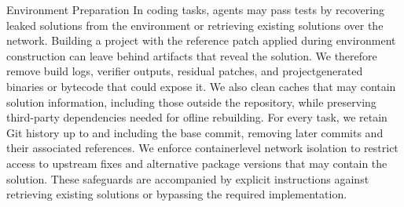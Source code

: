 \documentclass[
  10
]{article}
\begin{document}
Environment Preparation In coding tasks, agents may pass tests by
recovering leaked solutions from the environment or retrieving existing
solutions over the network. Building a project with the reference patch
applied during environment construction can leave behind artifacts that
reveal the solution. We therefore remove build logs, verifier outputs,
residual patches, and projectgenerated binaries or bytecode that could
expose it. We also clean caches that may contain solution information,
including those outside the repository, while preserving third-party
dependencies needed for ofline rebuilding. For every task, we retain Git
history up to and including the base commit, removing later commits and
their associated references. We enforce containerlevel network isolation
to restrict access to upstream fixes and alternative package versions
that may contain the solution. These safeguards are accompanied by
explicit instructions against retrieving existing solutions or bypassing
the required implementation.
\end{document}
